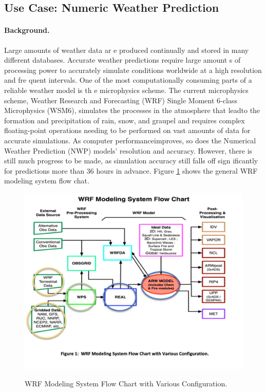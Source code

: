 \subsection{Use Case: Numeric Weather Prediction}


\paragraph*{Background.}
Large amounts of weather data ar e produced continually and stored in many different databases.
Accurate weather predictions require large amount s of processing power to accurately simulate
conditions worldwide at a high resolution and fre quent intervals. One of the most computationally
consuming parts of a reliable weather model is th e microphysics scheme. The current microphysics
scheme, Weather Research and Forecasting (WRF) Single Moment 6-class Microphysics (WSM6),
simulates the processes in the atmosphere that leadto the formation and precipitation of rain, snow,
and graupel and requires complex floating-point operations needing to be performed on vast
amounts of data for accurate simulations. As computer performanceimproves, so does the Numerical
Weather Prediction (NWP) models' resolution and accuracy. However, there is still much progress to
be made, as simulation accuracy still falls off sign ificantly for predictions more than 36 hours in
advance. Figure \ref{fig:weather-1} shows the general WRF modeling system flow chat.

\begin{figure}[htb]
\includegraphics[width=1.0\textwidth]{usecase/nwp-arch.png}
\label{fig:weather-1}
\caption{WRF Modeling System Flow Chart with Various Configuration.}
\end{figure}


